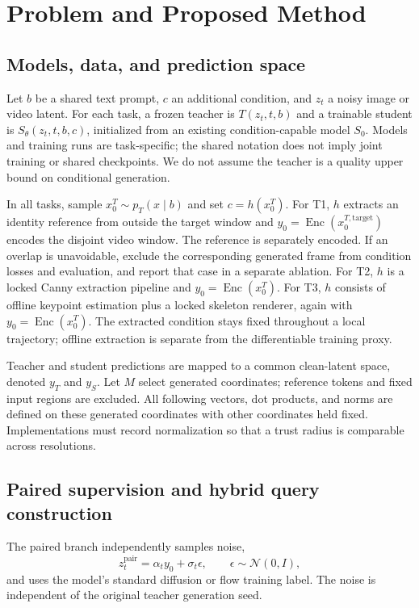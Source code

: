 \documentclass[11pt]{article}
\begin{document}
\section{Problem and Proposed Method}
\subsection{Models, data, and prediction space}
Let $b$ be a shared text prompt, $c$ an additional condition, and $z_t$ a noisy image or video latent. For each task, a frozen teacher is $T(z_t,t,b)$ and a trainable student is $S_\theta(z_t,t,b,c)$, initialized from an existing condition-capable model $S_0$. Models and training runs are task-specific; the shared notation does not imply joint training or shared checkpoints. We do not assume the teacher is a quality upper bound on conditional generation.

In all tasks, sample $x_0^T\sim p_T(x\mid b)$ and set $c=h(x_0^T)$. For T1, $h$ extracts an identity reference from outside the target window and $y_0=\operatorname{Enc}(x_0^{T,\mathrm{target}})$ encodes the disjoint video window. The reference is separately encoded. If an overlap is unavoidable, exclude the corresponding generated frame from condition losses and evaluation, and report that case in a separate ablation. For T2, $h$ is a locked Canny extraction pipeline and $y_0=\operatorname{Enc}(x_0^T)$. For T3, $h$ consists of offline keypoint estimation plus a locked skeleton renderer, again with $y_0=\operatorname{Enc}(x_0^T)$. The extracted condition stays fixed throughout a local trajectory; offline extraction is separate from the differentiable training proxy.

Teacher and student predictions are mapped to a common clean-latent space, denoted $y_T$ and $y_S$. Let $M$ select generated coordinates; reference tokens and fixed input regions are excluded. All following vectors, dot products, and norms are defined on these generated coordinates with other coordinates held fixed. Implementations must record normalization so that a trust radius is comparable across resolutions.

\subsection{Paired supervision and hybrid query construction}
The paired branch independently samples noise,
\begin{equation}
 z_t^{\mathrm{pair}}=\alpha_t y_0+\sigma_t\epsilon,
 \qquad \epsilon\sim\mathcal N(0,I),
\end{equation}
and uses the model's standard diffusion or flow training label. The noise is independent of the original teacher generation seed.
\end{document}
